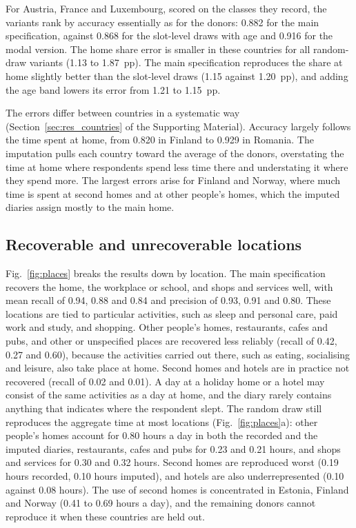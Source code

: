 \documentclass[a4paper]{article}
\begin{document}
For Austria, France and Luxembourg, scored on the classes they record, the variants rank by accuracy essentially as for the donors: 0.882 for the main specification, against 0.868 for the slot-level draws with age and 0.916 for the modal version. The home share error is smaller in these countries for all random-draw variants (1.13 to 1.87~pp). The main specification reproduces the share at home slightly better than the slot-level draws (1.15 against 1.20~pp), and adding the age band lowers its error from 1.21 to 1.15~pp.

The errors differ between countries in a systematic way (Section~\ref{sec:res_countries} of the Supporting Material). Accuracy largely follows the time spent at home, from 0.820 in Finland to 0.929 in Romania. The imputation pulls each country toward the average of the donors, overstating the time at home where respondents spend less time there and understating it where they spend more. The largest errors arise for Finland and Norway, where much time is spent at second homes and at other people's homes, which the imputed diaries assign mostly to the main home.

\subsection{Recoverable and unrecoverable locations}
\label{sec:res_places}

Fig.~\ref{fig:places} breaks the results down by location. The main specification recovers the home, the workplace or school, and shops and services well, with mean recall of 0.94, 0.88 and 0.84 and precision of 0.93, 0.91 and 0.80. These locations are tied to particular activities, such as sleep and personal care, paid work and study, and shopping. Other people's homes, restaurants, cafes and pubs, and other or unspecified places are recovered less reliably (recall of 0.42, 0.27 and 0.60), because the activities carried out there, such as eating, socialising and leisure, also take place at home. Second homes and hotels are in practice not recovered (recall of 0.02 and 0.01). A day at a holiday home or a hotel may consist of the same activities as a day at home, and the diary rarely contains anything that indicates where the respondent slept. The random draw still reproduces the aggregate time at most locations (Fig.~\ref{fig:places}a): other people's homes account for 0.80 hours a day in both the recorded and the imputed diaries, restaurants, cafes and pubs for 0.23 and 0.21 hours, and shops and services for 0.30 and 0.32 hours. Second homes are reproduced worst (0.19 hours recorded, 0.10 hours imputed), and hotels are also underrepresented (0.10 against 0.08 hours). The use of second homes is concentrated in Estonia, Finland and Norway (0.41 to 0.69 hours a day), and the remaining donors cannot reproduce it when these countries are held out.
\end{document}
